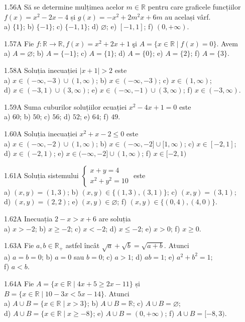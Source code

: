 \documentclass[11pt]{article}
\begin{document}
1.56A Să se determine mulțimea acelor $m \in \mathbb{R}$ pentru care graficele funcțiilor $f(x)=x^{2}-2 x-4$ și $g(x)=-x^{2}+2 m^{2} x+6 m$ au același vârf.\\ a) $\{1\}$; b) $\{-1\}$; c) $\{-1,1\}$; d) $\varnothing$; e) $[-1,1]$; f) $(0,+\infty)$.

1.57A Fie $f: \mathbb{R} \rightarrow \mathbb{R}, f(x)=x^{2}+2 x+1$ şi $A=\{x \in \mathbb{R} \mid f(x)=0\}$. Avem\\ a) $A=\varnothing$; b) $A=\{-1\}$; c) $A=\{1\}$; d) $A=\{0\}$; e) $A=\{2\}$; f) $A=\{3\}$.

1.58A Soluția inecuației $|x+1|>2$ este\\ a) $x \in(-\infty,-3) \cup(1, \infty)$; b) $x \in(-\infty,-3)$; c) $x \in(1, \infty)$;\\ d) $x \in(-3,1) \cup(3, \infty)$; e) $x \in(-\infty,-1) \cup(3, \infty)$; f) $x \in(-3, \infty)$.

1.59A Suma cuburilor soluțiilor ecuației $x^{2}-4 x+1=0$ este\\ a) $60$; b) $50$; c) $56$; d) $52$; e) $64$; f) $49$.

1.60A Soluția inecuației $x^{2}+x-2 \leq 0$ este\\ a) $x \in(-\infty,-2) \cup(1, \infty)$; b) $x \in(-\infty,-2] \cup[1, \infty)$; c) $x \in[-2,1]$;\\ d) $x \in(-2,1)$; e) $x \in(-\infty,-2] \cup(1, \infty)$; f) $x \in[-2,1)$

1.61A Soluția sistemului $\left\{\begin{array}{l}x+y=4 \\ x^{2}+y^{2}=10\end{array}\right.$ este\\ a) $(x, y)=(1,3)$; b) $(x, y) \in\{(1,3),(3,1)\}$; c) $(x, y)=(3,1)$;\\ d) $(x, y)=(2,2)$; e) $(x, y) \in \varnothing$; f) $(x, y) \in\{(0,4),(4,0)\}$.

1.62A Inecuația $2-x>x+6$ are soluția\\ a) $x>-2$; b) $x \geq-2$; c) $x<-2$; d) $x \leq-2$; e) $x>0$; f) $x \geq 0$.

1.63A Fie $a, b \in \mathbb{R}_{+}$ astfel încât $\sqrt{a}+\sqrt{b}=\sqrt{a+b}$. Atunci\\ a) $a=b=0$; b) $a=0$ sau $b=0$; c) $a>1$; d) $a b=1$; e) $a^{2}+b^{2}=1$;\\ f) $a<b$.

1.64A Fie $A=\{x \in \mathbb{R} \mid 4 x+5 \geq 2 x-11\}$ și\\ $B=\{x \in \mathbb{R} \mid 10-3 x<5 x-14\}$. Atunci\\ a) $A \cup B=\{x \in \mathbb{R} \mid x>3\}$; b) $A \cup B=\mathbb{R}$; c) $A \cup B=\varnothing$;\\ d) $A \cup B=\{x \in \mathbb{R} \mid x \geq-8\}$; e) $A \cup B=(0,+\infty)$; f) $A \cup B=[-8,3)$.
\end{document}

